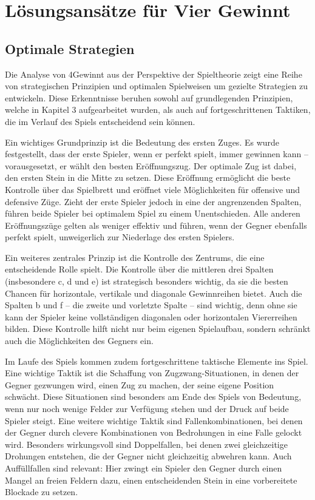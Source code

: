 \chapter{Lösungsansätze für Vier Gewinnt}

\section{Optimale Strategien}
Die Analyse von 4Gewinnt aus der Perspektive der Spieltheorie zeigt eine Reihe von strategischen Prinzipien und optimalen Spielweisen um gezielte Strategien zu entwickeln. Diese Erkenntnisse beruhen sowohl auf grundlegenden Prinzipien, welche in Kapitel 3 aufgearbeitet wurden, als auch auf fortgeschrittenen Taktiken, die im Verlauf des Spiels entscheidend sein können.

Ein wichtiges Grundprinzip ist die Bedeutung des ersten Zuges. Es wurde festgestellt, dass der erste Spieler, wenn er perfekt spielt, immer gewinnen kann – vorausgesetzt, er wählt den besten Eröffnungszug. Der optimale Zug ist dabei, den ersten Stein in die Mitte zu setzen. Diese Eröffnung ermöglicht die beste Kontrolle über das Spielbrett und eröffnet viele Möglichkeiten für offensive und defensive Züge. Zieht der erste Spieler jedoch in eine der angrenzenden Spalten, führen beide Spieler bei optimalem Spiel zu einem Unentschieden. Alle anderen Eröffnungszüge gelten als weniger effektiv und führen, wenn der Gegner ebenfalls perfekt spielt, unweigerlich zur Niederlage des ersten Spielers.

Ein weiteres zentrales Prinzip ist die Kontrolle des Zentrums, die eine entscheidende Rolle spielt. Die Kontrolle über die mittleren drei Spalten (insbesondere c, d und e) ist strategisch besonders wichtig, da sie die besten Chancen für horizontale, vertikale und diagonale Gewinnreihen bietet. Auch die Spalten b und f – die zweite und vorletzte Spalte – sind wichtig, denn ohne sie kann der Spieler keine vollständigen diagonalen oder horizontalen Viererreihen bilden. Diese Kontrolle hilft nicht nur beim eigenen Spielaufbau, sondern schränkt auch die Möglichkeiten des Gegners ein.

Im Laufe des Spiels kommen zudem fortgeschrittene taktische Elemente ins Spiel. Eine wichtige Taktik ist die Schaffung von Zugzwang-Situationen, in denen der Gegner gezwungen wird, einen Zug zu machen, der seine eigene Position schwächt. Diese Situationen sind besonders am Ende des Spiels von Bedeutung, wenn nur noch wenige Felder zur Verfügung stehen und der Druck auf beide Spieler steigt. Eine weitere wichtige Taktik sind Fallenkombinationen, bei denen der Gegner durch clevere Kombinationen von Bedrohungen in eine Falle gelockt wird. Besonders wirkungsvoll sind Doppelfallen, bei denen zwei gleichzeitige Drohungen entstehen, die der Gegner nicht gleichzeitig abwehren kann. Auch Auffüllfallen sind relevant: Hier zwingt ein Spieler den Gegner durch einen Mangel an freien Feldern dazu, einen entscheidenden Stein in eine vorbereitete Blockade zu setzen.

